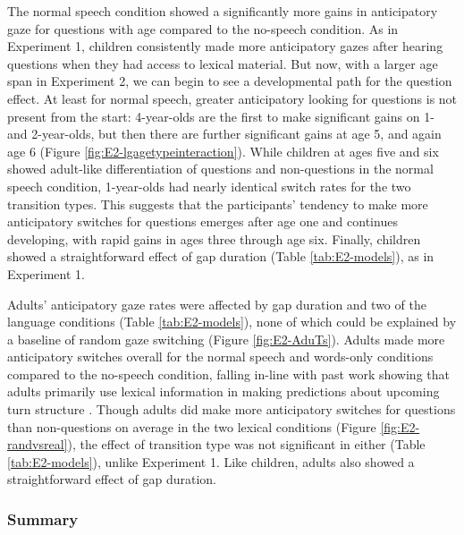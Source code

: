 \documentclass[authoryear, 12pt]{elsarticle}
\begin{document}
The normal speech condition showed a significantly more gains in anticipatory gaze for questions with age compared to the no-speech condition. As in Experiment 1, children consistently made more anticipatory gazes after hearing questions when they had access to lexical material. But now, with a larger age span in Experiment 2, we can begin to see a developmental path for the question effect. At least for normal speech, greater anticipatory looking for questions is not present from the start: 4-year-olds are the first to make significant gains on 1- and 2-year-olds, but then there are further significant gains at age 5, and again age 6 (Figure \ref{fig:E2-lgagetypeinteraction}). While children at ages five and six showed adult-like differentiation of questions and non-questions in the normal speech condition, 1-year-olds had nearly identical switch rates for the two transition types. This suggests that the participants' tendency to make more anticipatory switches for questions emerges after age one and continues developing, with rapid gains in ages three through age six. Finally, children showed a straightforward effect of gap duration (Table \ref{tab:E2-models}), as in Experiment 1.

Adults' anticipatory gaze rates were affected by gap duration and two of the language conditions (Table \ref{tab:E2-models}), none of which could be explained by a baseline of random gaze switching (Figure \ref{fig:E2-AduTs}). Adults made more anticipatory switches overall for the normal speech and words-only conditions compared to the no-speech condition, falling in-line with past work showing that adults primarily use lexical information in making predictions about upcoming turn structure \citep{de-ruiter2006}. Though adults did make more anticipatory switches for questions than non-questions on average in the two lexical conditions (Figure \ref{fig:E2-randvsreal}), the effect of transition type was not significant in either (Table \ref{tab:E2-models}), unlike Experiment 1. Like children, adults also showed a straightforward effect of gap duration.

\subsubsection{Summary}
\label{sec:summary2}
\end{document}
